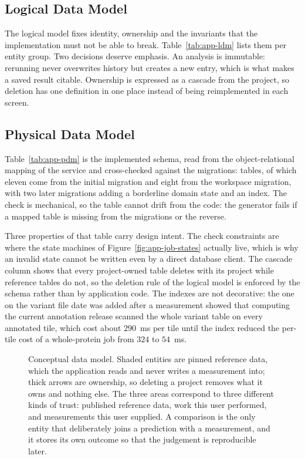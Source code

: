 \subsection{Logical Data Model}
The logical model fixes identity, ownership and the invariants that the implementation must not be
able to break. Table~\ref{tab:app-ldm} lists them per entity group. Two decisions deserve emphasis.
An analysis is immutable: rerunning never overwrites history but creates a new entry, which is what
makes a saved result citable. Ownership is expressed as a cascade from the project, so deletion has
one definition in one place instead of being reimplemented in each screen.

\subsection{Physical Data Model}
Table~\ref{tab:app-pdm} is the implemented schema, read from the object-relational mapping of the
service and cross-checked against the migrations: \nAppTables{} tables, of which eleven come from the
initial migration and eight from the workspace migration, with two later migrations adding a
borderline domain state and an index. The check is mechanical, so the table cannot drift from the
code: the generator fails if a mapped table is missing from the migrations or the reverse.

Three properties of that table carry design intent. The check constraints are where the state
machines of Figure~\ref{fig:app-job-states} actually live, which is why an invalid state cannot be
written even by a direct database client. The cascade column shows that every project-owned table
deletes with its project while reference tables do not, so the deletion rule of the logical model is
enforced by the schema rather than by application code. The indexes are not decorative: the one on
the variant file date was added after a measurement showed that computing the current annotation
release scanned the whole variant table on every annotated tile, which cost about
$290$~ms per tile until the index reduced the per-tile cost of a whole-protein job from $324$ to
$54$~ms.

\begin{figure}[htbp]
  \centering
  
  \caption[Conceptual data model]{Conceptual data model. Shaded entities are pinned reference data, which the application reads
  and never writes a measurement into; thick arrows are ownership, so deleting a project removes
  what it owns and nothing else. The three areas correspond to three different kinds of trust:
  published reference data, work this user performed, and measurements this user supplied. A
  comparison is the only entity that deliberately joins a prediction with a measurement, and it
  stores its own outcome so that the judgement is reproducible later.}
  \label{fig:app-cdm}
\end{figure}


